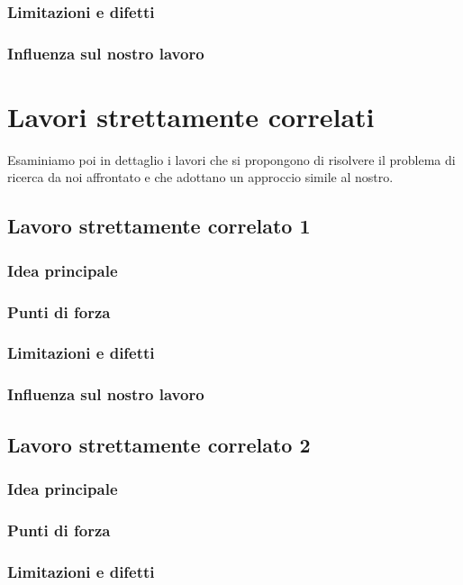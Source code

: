 \subsubsection{Limitazioni e difetti}
\subsubsection{Influenza sul nostro lavoro}

\section{Lavori strettamente correlati}

Esaminiamo poi in dettaglio i lavori che si propongono di risolvere il problema di ricerca da noi affrontato e che adottano un approccio simile al nostro.

\subsection{Lavoro strettamente correlato 1}
\subsubsection{Idea principale}
\subsubsection{Punti di forza}
\subsubsection{Limitazioni e difetti}
\subsubsection{Influenza sul nostro lavoro}

\subsection{Lavoro strettamente correlato 2}
\subsubsection{Idea principale}
\subsubsection{Punti di forza}
\subsubsection{Limitazioni e difetti}

